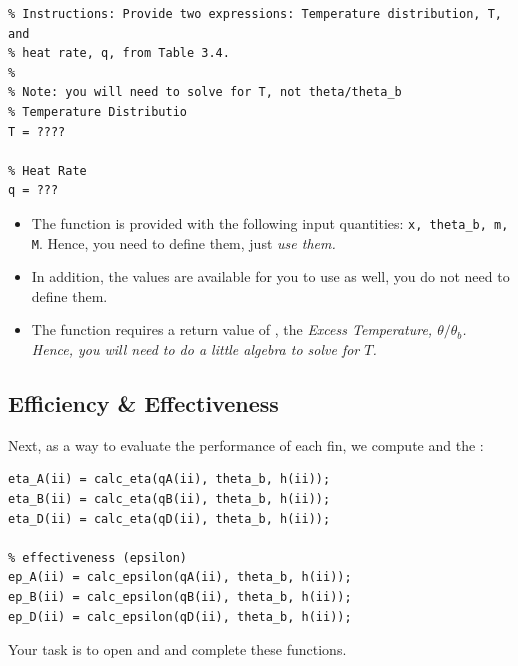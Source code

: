 \documentclass[11pt, letterpaper]{article}
\begin{document}
\begin{lstlisting}[numbers=none]
% ====================== YOUR CODE HERE ======================
% Instructions: Provide two expressions: Temperature distribution, T, and
% heat rate, q, from Table 3.4.
%
% Note: you will need to solve for T, not theta/theta_b
% Temperature Distributio 
T = ????

% Heat Rate
q = ???
\end{lstlisting}
\begin{center}
\begin{tcolorbox}[enhanced, width=14cm, size=tight, top=-2mm, colback=red!5, colframe=black!50!white, boxrule=0.25pt, boxsep=2mm]
\n
{\small
{}
\begin{itemize}
    \item The function is provided with the following input quantities: \texttt{x, theta\_b, m, M}. Hence, you  need to define them, just \it{use} them. 
    \item In addition, the  values are available for you to use as well, you do not need to define them. 
    \item The function requires a return value of ,  the \it{Excess Temperature, $\theta / \theta_b$}. Hence, you will need to do a little algebra to solve for $T$.
\end{itemize}
}
\end{tcolorbox}
\end{center}

\subsection{Efficiency \& Effectiveness}

Next, as a way to evaluate the performance of each fin, we compute  and the :

\begin{lstlisting}[numbers=none]
% efficiency (eta)
eta_A(ii) = calc_eta(qA(ii), theta_b, h(ii));
eta_B(ii) = calc_eta(qB(ii), theta_b, h(ii));
eta_D(ii) = calc_eta(qD(ii), theta_b, h(ii));

% effectiveness (epsilon)
ep_A(ii) = calc_epsilon(qA(ii), theta_b, h(ii));
ep_B(ii) = calc_epsilon(qB(ii), theta_b, h(ii));
ep_D(ii) = calc_epsilon(qD(ii), theta_b, h(ii));
\end{lstlisting}

\n
Your task is to open  and  and complete these functions.
\n
\end{document}

